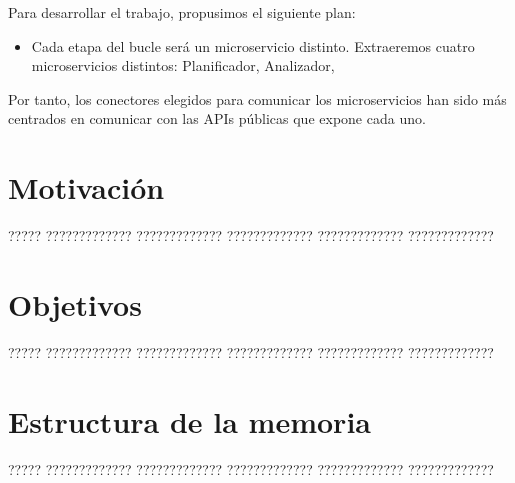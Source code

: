 Para desarrollar el trabajo, propusimos el siguiente plan:
\begin{itemize}
  \item Cada etapa del bucle será un microservicio distinto. Extraeremos cuatro microservicios distintos: Planificador, Analizador,
\end{itemize}

Por tanto, los conectores elegidos para comunicar los microservicios han sido más centrados en comunicar con las APIs públicas que expone cada uno.

\section{Motivación}

????? ????????????? ????????????? ????????????? ????????????? ?????????????

\section{Objetivos}

????? ????????????? ????????????? ????????????? ????????????? ?????????????

\section{Estructura de la memoria}

????? ????????????? ????????????? ????????????? ????????????? ?????????????


